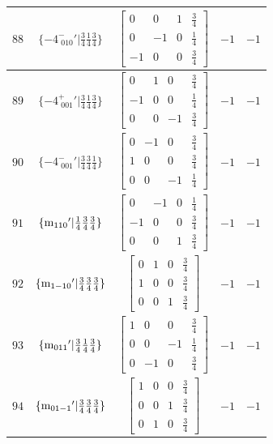 \documentclass[fleqn,8pt]{jsarticle}
\begin{document}
\begin{longtable}{ccccc}
$ 88 $ & $ \{-4^{-}_{\,\,010}{}'|\frac{3}{4} \frac{1}{4} \frac{3}{4}\} $ & $ \begin{bmatrix} 0 & 0 & 1 & \frac{3}{4} \\ 0 & -1 & 0 & \frac{1}{4} \\ -1 & 0 & 0 & \frac{3}{4} \end{bmatrix} $ & $ -1 $ & $ -1 $ \\ \hline
$ 89 $ & $ \{-4^{+}_{\,\,001}{}'|\frac{3}{4} \frac{1}{4} \frac{3}{4}\} $ & $ \begin{bmatrix} 0 & 1 & 0 & \frac{3}{4} \\ -1 & 0 & 0 & \frac{1}{4} \\ 0 & 0 & -1 & \frac{3}{4} \end{bmatrix} $ & $ -1 $ & $ -1 $ \\ \hline
$ 90 $ & $ \{-4^{-}_{\,\,001}{}'|\frac{3}{4} \frac{3}{4} \frac{1}{4}\} $ & $ \begin{bmatrix} 0 & -1 & 0 & \frac{3}{4} \\ 1 & 0 & 0 & \frac{3}{4} \\ 0 & 0 & -1 & \frac{1}{4} \end{bmatrix} $ & $ -1 $ & $ -1 $ \\ \hline
$ 91 $ & $ \{{\rm m}_{110}{}'|\frac{1}{4} \frac{3}{4} \frac{3}{4}\} $ & $ \begin{bmatrix} 0 & -1 & 0 & \frac{1}{4} \\ -1 & 0 & 0 & \frac{3}{4} \\ 0 & 0 & 1 & \frac{3}{4} \end{bmatrix} $ & $ -1 $ & $ -1 $ \\ \hline
$ 92 $ & $ \{{\rm m}_{1-10}{}'|\frac{3}{4} \frac{3}{4} \frac{3}{4}\} $ & $ \begin{bmatrix} 0 & 1 & 0 & \frac{3}{4} \\ 1 & 0 & 0 & \frac{3}{4} \\ 0 & 0 & 1 & \frac{3}{4} \end{bmatrix} $ & $ -1 $ & $ -1 $ \\ \hline
$ 93 $ & $ \{{\rm m}_{011}{}'|\frac{3}{4} \frac{1}{4} \frac{3}{4}\} $ & $ \begin{bmatrix} 1 & 0 & 0 & \frac{3}{4} \\ 0 & 0 & -1 & \frac{1}{4} \\ 0 & -1 & 0 & \frac{3}{4} \end{bmatrix} $ & $ -1 $ & $ -1 $ \\ \hline
$ 94 $ & $ \{{\rm m}_{01-1}{}'|\frac{3}{4} \frac{3}{4} \frac{3}{4}\} $ & $ \begin{bmatrix} 1 & 0 & 0 & \frac{3}{4} \\ 0 & 0 & 1 & \frac{3}{4} \\ 0 & 1 & 0 & \frac{3}{4} \end{bmatrix} $ & $ -1 $ & $ -1 $ \\ \hline

\end{longtable}
\end{document}
